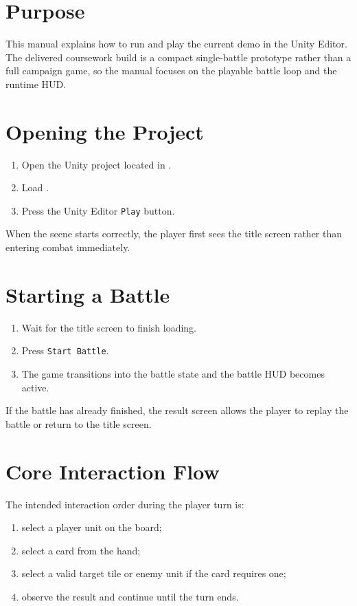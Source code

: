 \section{Purpose}

This manual explains how to run and play the current \projectname{} demo in the Unity Editor. The delivered coursework build is a compact single-battle prototype rather than a full campaign game, so the manual focuses on the playable battle loop and the runtime HUD.

\section{Opening the Project}

\begin{enumerate}
    \item Open the Unity project located in .
    \item Load .
    \item Press the Unity Editor \texttt{Play} button.
\end{enumerate}

When the scene starts correctly, the player first sees the title screen rather than entering combat immediately.

\section{Starting a Battle}

\begin{enumerate}
    \item Wait for the title screen to finish loading.
    \item Press \texttt{Start Battle}.
    \item The game transitions into the battle state and the battle HUD becomes active.
\end{enumerate}

If the battle has already finished, the result screen allows the player to replay the battle or return to the title screen.

\section{Core Interaction Flow}

The intended interaction order during the player turn is:

\begin{enumerate}
    \item select a player unit on the board;
    \item select a card from the hand;
    \item select a valid target tile or enemy unit if the card requires one;
    \item observe the result and continue until the turn ends.
\end{enumerate}

